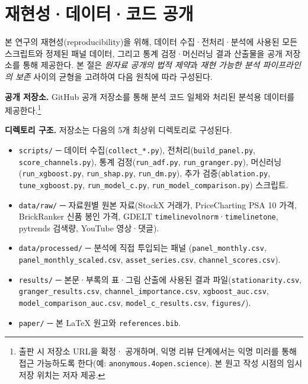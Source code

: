 \documentclass[11pt, a4paper, twocolumn]{article}
\begin{document}
\section{재현성·데이터·코드 공개}\label{sec:appendix-repro}

본 연구의 재현성(reproducibility)을 위해, 데이터 수집·전처리·분석에
사용된 모든 스크립트와 정제된 패널 데이터, 그리고 통계 검정·머신러닝
결과 산출물을 공개 저장소를 통해 제공한다. 본 절은 \emph{원자료
공개의 법적 제약}과 \emph{재현 가능한 분석 파이프라인의 보존} 사이의
균형을 고려하여 다음 원칙에 따라 구성된다.

\textbf{공개 저장소.} GitHub 공개 저장소를 통해 분석 코드 일체와
처리된 분석용 데이터를 제공한다.\footnote{출판 시 저장소 URL을 확정·
공개하며, 익명 리뷰 단계에서는 익명 미러를 통해 접근 가능하도록
한다(예: \texttt{anonymous.4open.science}). 본 원고 작성 시점의 임시
저장 위치는 저자 제공.}

\textbf{디렉토리 구조.} 저장소는 다음의 5개 최상위 디렉토리로 구성된다.
\begin{itemize}[leftmargin=1.4em, topsep=0pt, itemsep=0pt]
  \item \texttt{scripts/} ─ 데이터 수집(\texttt{collect\_*.py}),
        전처리(\texttt{build\_panel.py}, \texttt{score\_channels.py}),
        통계 검정(\texttt{run\_adf.py}, \texttt{run\_granger.py}),
        머신러닝(\texttt{run\_xgboost.py}, \texttt{run\_shap.py},
        \texttt{run\_dm.py}), 추가 검증(\texttt{ablation.py},
        \texttt{tune\_xgboost.py}, \texttt{run\_model\_c.py},
        \texttt{run\_model\_comparison.py}) 스크립트.
  \item \texttt{data/raw/} ─ 자료원별 원본 자료(StockX 거래가,
        PriceCharting PSA 10 가격, BrickRanker 신품 봉인 가격,
        GDELT \texttt{timelinevolnorm}·\texttt{timelinetone},
        pytrends 검색량, YouTube 영상·댓글).
  \item \texttt{data/processed/} ─ 분석에 직접 투입되는 패널
        (\texttt{panel\_monthly.csv}, \texttt{panel\_monthly\_scaled.csv},
        \texttt{asset\_series.csv}, \texttt{channel\_scores.csv}).
  \item \texttt{results/} ─ 본문·부록의 표·그림 산출에 사용된 결과
        파일(\texttt{stationarity.csv}, \texttt{granger\_results.csv},
        \texttt{channel\_importance.csv}, \texttt{xgboost\_auc.csv},
        \texttt{model\_comparison\_auc.csv}, \texttt{model\_c\_results.csv},
        \texttt{figures/}).
  \item \texttt{paper/} ─ 본 \LaTeX{} 원고와 \texttt{references.bib}.
\end{itemize}
\end{document}
